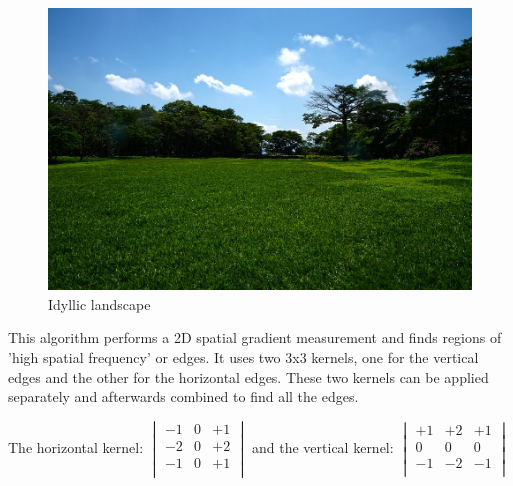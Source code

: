 \documentclass[12pt]{article}
\begin{document}
\begin{figure}[h]
\centering
\includegraphics[scale = 0.3]{img/landscape}
\caption{Idyllic landscape}
\end{figure}

\newpage

 This algorithm performs a 2D spatial gradient measurement and finds regions of 'high spatial frequency' or edges. It uses two 3x3 kernels, one for the vertical edges and the other for the horizontal edges. These two kernels can be applied separately and afterwards combined to find all the edges.
 \newline

 The horizontal kernel: 
 $\begin{vmatrix}
        -1 & 0 & +1\\
        -2 & 0 & +2\\
        -1 & 0 & +1\\
\end{vmatrix}$
and the vertical kernel:
$\begin{vmatrix}
        +1 & +2 & +1\\
        0 & 0 & 0\\
        -1 & -2 & -1\\
\end{vmatrix}$
\end{document}
